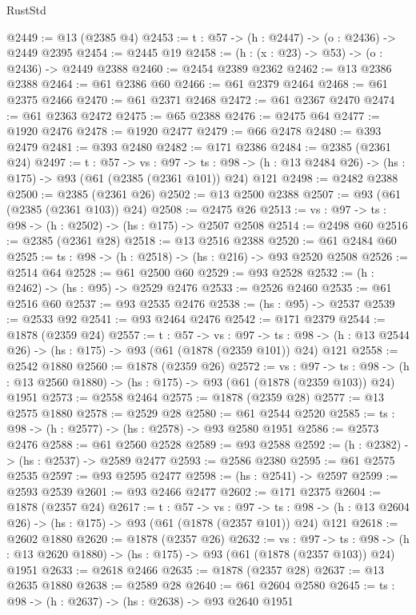\begin{lexlean}{RustStd}
\begin{coremodule}
@2449 := @13 (@2385 @4)
@2453 := {t : @57} -> (h : @2447) -> (o : @2436) -> @2449 @2395
@2454 := @2445 @19
@2458 := (h : (x : @23) -> @53) -> (o : @2436) -> @2449 @2388
@2460 := @2454 @2389 @2362
@2462 := @13 @2386 @2388
@2464 := @61 @2386 @60
@2466 := @61 @2379 @2464
@2468 := @61 @2375 @2466
@2470 := @61 @2371 @2468
@2472 := @61 @2367 @2470
@2474 := @61 @2363 @2472
@2475 := @65 @2388
@2476 := @2475 @64
@2477 := @1920 @2476
@2478 := @1920 @2477
@2479 := @66 @2478
@2480 := @393 @2479
@2481 := @393 @2480
@2482 := @171 @2386
@2484 := @2385 (@2361 @24)
@2497 := {t : @57} ->
  {vs : @97} ->
  {ts : @98} -> (h : @13 @2484 @26) -> (hs : @175) -> @93 (@61 (@2385 (@2361 @101)) @24) @121
@2498 := @2482 @2388
@2500 := @2385 (@2361 @26)
@2502 := @13 @2500 @2388
@2507 := @93 (@61 (@2385 (@2361 @103)) @24)
@2508 := @2475 @26
@2513 := {vs : @97} -> {ts : @98} -> (h : @2502) -> (hs : @175) -> @2507 @2508
@2514 := @2498 @60
@2516 := @2385 (@2361 @28)
@2518 := @13 @2516 @2388
@2520 := @61 @2484 @60
@2525 := {ts : @98} -> (h : @2518) -> (hs : @216) -> @93 @2520 @2508
@2526 := @2514 @64
@2528 := @61 @2500 @60
@2529 := @93 @2528
@2532 := (h : @2462) -> (hs : @95) -> @2529 @2476
@2533 := @2526 @2460
@2535 := @61 @2516 @60
@2537 := @93 @2535 @2476
@2538 := (hs : @95) -> @2537
@2539 := @2533 @92
@2541 := @93 @2464 @2476
@2542 := @171 @2379
@2544 := @1878 (@2359 @24)
@2557 := {t : @57} ->
  {vs : @97} ->
  {ts : @98} -> (h : @13 @2544 @26) -> (hs : @175) -> @93 (@61 (@1878 (@2359 @101)) @24) @121
@2558 := @2542 @1880
@2560 := @1878 (@2359 @26)
@2572 := {vs : @97} ->
  {ts : @98} -> (h : @13 @2560 @1880) -> (hs : @175) -> @93 (@61 (@1878 (@2359 @103)) @24) @1951
@2573 := @2558 @2464
@2575 := @1878 (@2359 @28)
@2577 := @13 @2575 @1880
@2578 := @2529 @28
@2580 := @61 @2544 @2520
@2585 := {ts : @98} -> (h : @2577) -> (hs : @2578) -> @93 @2580 @1951
@2586 := @2573 @2476
@2588 := @61 @2560 @2528
@2589 := @93 @2588
@2592 := (h : @2382) -> (hs : @2537) -> @2589 @2477
@2593 := @2586 @2380
@2595 := @61 @2575 @2535
@2597 := @93 @2595 @2477
@2598 := (hs : @2541) -> @2597
@2599 := @2593 @2539
@2601 := @93 @2466 @2477
@2602 := @171 @2375
@2604 := @1878 (@2357 @24)
@2617 := {t : @57} ->
  {vs : @97} ->
  {ts : @98} -> (h : @13 @2604 @26) -> (hs : @175) -> @93 (@61 (@1878 (@2357 @101)) @24) @121
@2618 := @2602 @1880
@2620 := @1878 (@2357 @26)
@2632 := {vs : @97} ->
  {ts : @98} -> (h : @13 @2620 @1880) -> (hs : @175) -> @93 (@61 (@1878 (@2357 @103)) @24) @1951
@2633 := @2618 @2466
@2635 := @1878 (@2357 @28)
@2637 := @13 @2635 @1880
@2638 := @2589 @28
@2640 := @61 @2604 @2580
@2645 := {ts : @98} -> (h : @2637) -> (hs : @2638) -> @93 @2640 @1951

\end{coremodule}
\end{lexlean}
